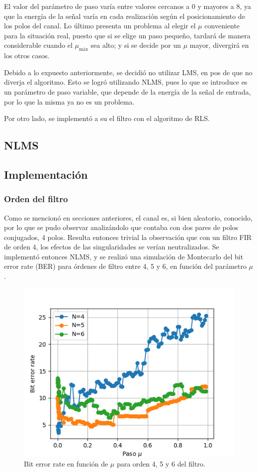 \documentclass[main.tex]{subfiles}
\begin{document}
El valor del parámetro de paso varía entre valores cercanos a 0 y mayores a 8, 
ya que la energ\'ia de la se\~nal var\'ia en cada realizaci\'on seg\'un el posicionamiento de los polos del canal. Lo último presenta un problema al elegir el $\mu$ conveniente para la situación real,
puesto que si se elige un paso pequeño, tardará de manera considerable cuando el $\mu_\text{máx}$ sea alto;
y si se decide por un $\mu$ mayor, divergirá en los otros casos. \newline

Debido a lo expuesto anteriormente, se decidió no utilizar LMS, en pos de que no diverja el algoritmo. 
Esto se logró utilizando NLMS, pues lo que se introduce es un parámetro de paso variable, que depende
de la energía de la señal de entrada, por lo que la misma ya no es un problema.

Por otro lado, se implement\'o a su el filtro con el algoritmo de RLS.

\subsection*{NLMS}
\subsection*{Implementación}
\subsubsection*{Orden del filtro}
Como se mencionó en secciones anteriores, el canal es, si bien aleatorio, conocido, por 
lo que se pudo observar analizándolo que contaba con dos pares de polos conjugados, 4 polos.
Resulta entonces trivial la observación que con un filtro FIR de orden 4, los efectos 
de las singularidades se verían neutralizados. Se implementó entonces NLMS, y se realizó
una simulación de Montecarlo del bit error rate (BER) para órdenes de filtro entre 4, 5 y 6, en función del parámetro 
$\mu$.

\begin{figure}[H]
    \centering
    \includegraphics[scale=0.6]{imagenes/N_filter.png}
    \caption{Bit error rate en función de $\mu$ para orden 4, 5 y 6 del filtro.}
\end{figure}
\end{document}
